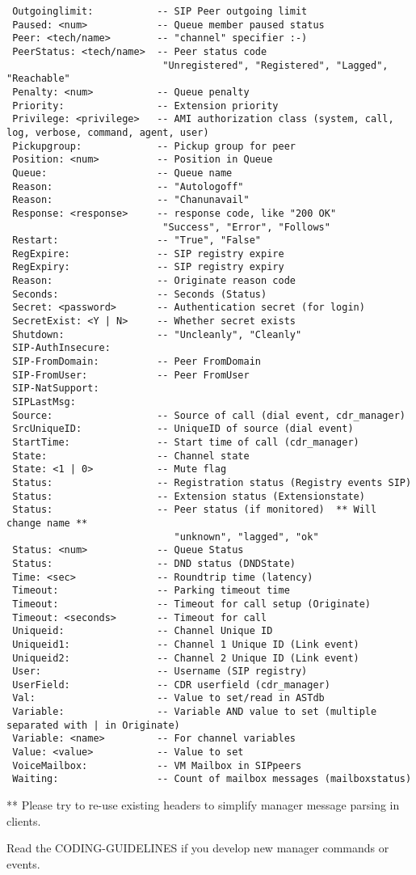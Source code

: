 \begin{verbatim}
 Outgoinglimit:           -- SIP Peer outgoing limit
 Paused: <num>            -- Queue member paused status
 Peer: <tech/name>        -- "channel" specifier :-)
 PeerStatus: <tech/name>  -- Peer status code
                           "Unregistered", "Registered", "Lagged", "Reachable"
 Penalty: <num>           -- Queue penalty
 Priority:                -- Extension priority
 Privilege: <privilege>   -- AMI authorization class (system, call, log, verbose, command, agent, user)
 Pickupgroup:             -- Pickup group for peer
 Position: <num>          -- Position in Queue
 Queue:                   -- Queue name
 Reason:                  -- "Autologoff"
 Reason:                  -- "Chanunavail"
 Response: <response>     -- response code, like "200 OK"
                           "Success", "Error", "Follows"
 Restart:                 -- "True", "False"
 RegExpire:               -- SIP registry expire
 RegExpiry:               -- SIP registry expiry
 Reason:                  -- Originate reason code
 Seconds:                 -- Seconds (Status)
 Secret: <password>       -- Authentication secret (for login)
 SecretExist: <Y | N>     -- Whether secret exists
 Shutdown:                -- "Uncleanly", "Cleanly"
 SIP-AuthInsecure:
 SIP-FromDomain:          -- Peer FromDomain
 SIP-FromUser:            -- Peer FromUser
 SIP-NatSupport:
 SIPLastMsg:
 Source:                  -- Source of call (dial event, cdr_manager)
 SrcUniqueID:             -- UniqueID of source (dial event)
 StartTime:               -- Start time of call (cdr_manager)
 State:                   -- Channel state
 State: <1 | 0>           -- Mute flag
 Status:                  -- Registration status (Registry events SIP)
 Status:                  -- Extension status (Extensionstate)
 Status:                  -- Peer status (if monitored)  ** Will change name **
                             "unknown", "lagged", "ok"
 Status: <num>            -- Queue Status
 Status:                  -- DND status (DNDState)
 Time: <sec>              -- Roundtrip time (latency)
 Timeout:                 -- Parking timeout time
 Timeout:                 -- Timeout for call setup (Originate)
 Timeout: <seconds>       -- Timeout for call
 Uniqueid:                -- Channel Unique ID
 Uniqueid1:               -- Channel 1 Unique ID (Link event)
 Uniqueid2:               -- Channel 2 Unique ID (Link event)
 User:                    -- Username (SIP registry)
 UserField:               -- CDR userfield (cdr_manager)
 Val:                     -- Value to set/read in ASTdb
 Variable:                -- Variable AND value to set (multiple separated with | in Originate)
 Variable: <name>         -- For channel variables
 Value: <value>           -- Value to set
 VoiceMailbox:            -- VM Mailbox in SIPpeers
 Waiting:                 -- Count of mailbox messages (mailboxstatus)
\end{verbatim}

 ** Please try to re-use existing headers to simplify manager message parsing in clients.

Read the CODING-GUIDELINES if you develop new manager commands or events.
